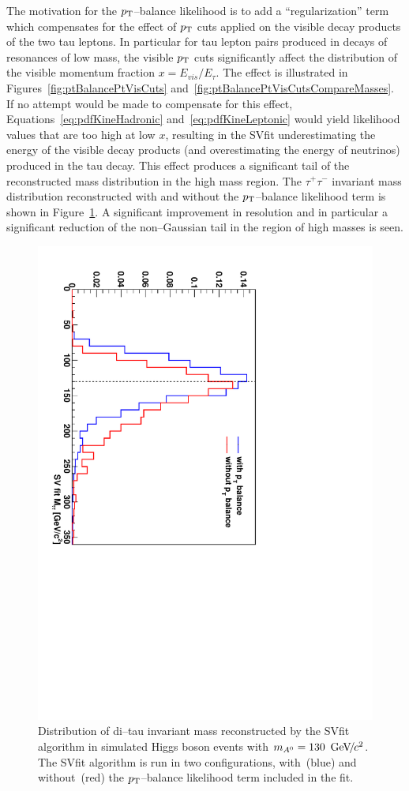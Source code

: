 The motivation for the $p_{\mathrm{T}}$--balance likelihood is to add a ``regularization''
term which compensates for the effect of $p_{\mathrm{T}}$ cuts applied on the visible decay
products of the two tau leptons.  In particular for tau lepton pairs produced in
decays of resonances of low mass, the visible $p_{\mathrm{T}}$ cuts significantly affect
the distribution of the visible momentum fraction \mbox{$x =
E_{vis}/{E_{\tau}}$}.  The effect is illustrated in
Figures~\ref{fig:ptBalancePtVisCuts}
and~\ref{fig:ptBalancePtVisCutsCompareMasses}.  If no attempt would be made to
compensate for this effect, Equations~\ref{eq:pdfKineHadronic}
and~\ref{eq:pdfKineLeptonic} would yield likelihood values that are too high at
low $x$, resulting in the SVfit underestimating the energy of the visible decay
products (and overestimating the energy of neutrinos) produced in the tau decay.
This effect produces a significant tail of the reconstructed mass distribution
in the high mass region.  The $\tau^{+} \tau^{-}$ invariant mass distribution
reconstructed with and without the $p_{\mathrm{T}}$--balance likelihood term is shown in
Figure~\ref{fig:ptBalanceImprovedMassResolution}.  A significant improvement in
resolution and in particular a significant reduction of the non--Gaussian tail
in the region of high masses is seen.

\begin{figure}[t]
\begin{center}
\includegraphics*[height=0.75\textwidth, angle=90]{svfit_chapter/figures/pt_balance_effect.pdf} \caption[Effect of
\pt--balance term on SVfit performance]{\captiontext Distribution of di--tau
invariant mass reconstructed by the SVfit algorithm in simulated Higgs boson events
with \mbox{$m_{A^0} = 130~{\,\text{Ge\hspace{-.08em}V\hspace{-0.16em}/\hspace{-0.08em}}c^\text{2}}$}.  The SVfit algorithm is run in two
configurations, with~(blue) and without~(red) the $p_{\mathrm{T}}$--balance likelihood term
included in the fit. 
} \label{fig:ptBalanceImprovedMassResolution}
\end{center}
\end{figure} 

